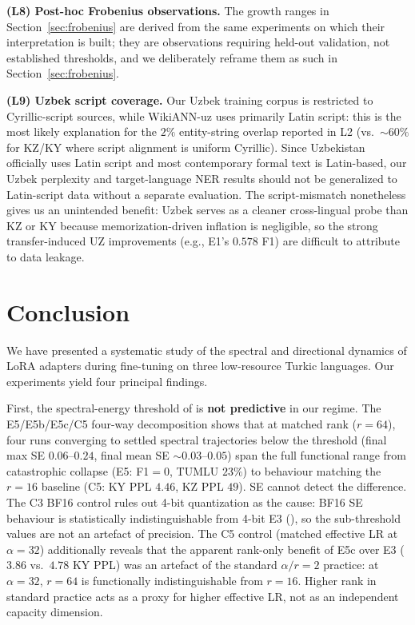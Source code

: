 \documentclass[11pt]{article}
\begin{document}
\textbf{(L8) Post-hoc Frobenius observations.} The growth ranges in Section~\ref{sec:frobenius} are derived from the same experiments on which their interpretation is built; they are observations requiring held-out validation, not established thresholds, and we deliberately reframe them as such in Section~\ref{sec:frobenius}.

\textbf{(L9) Uzbek script coverage.} Our Uzbek training corpus is restricted to Cyrillic-script sources, while WikiANN-uz uses primarily Latin script: this is the most likely explanation for the $2\%$ entity-string overlap reported in L2 (vs.\ $\sim 60\%$ for KZ/KY where script alignment is uniform Cyrillic). Since Uzbekistan officially uses Latin script and most contemporary formal text is Latin-based, our Uzbek perplexity and target-language NER results should not be generalized to Latin-script data without a separate evaluation. The script-mismatch nonetheless gives us an unintended benefit: Uzbek serves as a cleaner cross-lingual probe than KZ or KY because memorization-driven inflation is negligible, so the strong transfer-induced UZ improvements (e.g., E1's $0.578$ F1) are difficult to attribute to data leakage.

\section{Conclusion}

We have presented a systematic study of the spectral and directional dynamics of LoRA adapters during fine-tuning on three low-resource Turkic languages. Our experiments yield four principal findings.

First, the spectral-energy threshold of \citet{biderman2024lora} is \textbf{not predictive} in our regime. The E5/E5b/E5c/C5 four-way decomposition shows that at matched rank ($r{=}64$), four runs converging to settled spectral trajectories below the threshold (final max SE $0.06$--$0.24$, final mean SE $\sim 0.03$--$0.05$) span the full functional range from catastrophic collapse (E5: F1$=0$, TUMLU $23\%$) to behaviour matching the $r{=}16$ baseline (C5: KY PPL $4.46$, KZ PPL $49$). SE cannot detect the difference. The C3 BF16 control rules out 4-bit quantization as the cause: BF16 SE behaviour is statistically indistinguishable from 4-bit E3 (), so the sub-threshold values are not an artefact of precision. The C5 control (matched effective LR at $\alpha{=}32$) additionally reveals that the apparent rank-only benefit of E5c over E3 ($3.86$ vs.\ $4.78$ KY PPL) was an artefact of the standard $\alpha/r=2$ practice: at $\alpha{=}32$, $r{=}64$ is functionally indistinguishable from $r{=}16$. Higher rank in standard practice acts as a proxy for higher effective LR, not as an independent capacity dimension.
\end{document}
